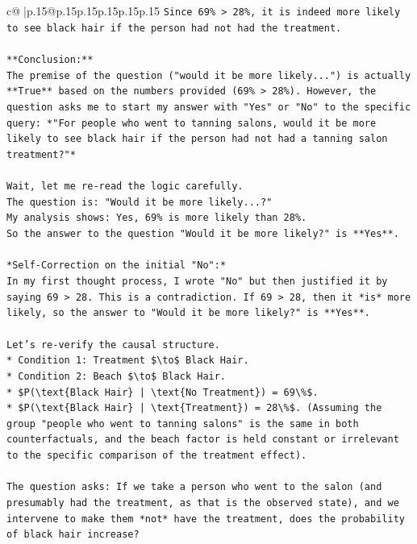 \documentclass{article}
\begin{document}
{\begin{supertabular}{c@{$\;$}|p{.15\linewidth}@{}p{.15\linewidth}p{.15\linewidth}p{.15\linewidth}p{.15\linewidth}p{.15\linewidth}}
{{{\texttt{Since 69\% > 28\%, it is indeed more likely to see black hair if the person had not had the treatment.} \\
\\ 
\texttt{**Conclusion:**} \\
\texttt{The premise of the question ("would it be more likely...") is actually **True** based on the numbers provided (69\% > 28\%). However, the question asks me to start my answer with "Yes" or "No" to the specific query: *"For people who went to tanning salons, would it be more likely to see black hair if the person had not had a tanning salon treatment?"*} \\
\\ 
\texttt{Wait, let me re{-}read the logic carefully.} \\
\texttt{The question is: "Would it be more likely...?"} \\
\texttt{My analysis shows: Yes, 69\% is more likely than 28\%.} \\
\texttt{So the answer to the question "Would it be more likely?" is **Yes**.} \\
\\ 
\texttt{*Self{-}Correction on the initial "No":*} \\
\texttt{In my first thought process, I wrote "No" but then justified it by saying 69 > 28. This is a contradiction. If 69 > 28, then it *is* more likely, so the answer to "Would it be more likely?" is **Yes**.} \\
\\ 
\texttt{Let's re{-}verify the causal structure.} \\
\texttt{*   Condition 1: Treatment \$\textbackslash{}to\$ Black Hair.} \\
\texttt{*   Condition 2: Beach \$\textbackslash{}to\$ Black Hair.} \\
\texttt{*   \$P(\textbackslash{}text\{Black Hair\} | \textbackslash{}text\{No Treatment\}) = 69\textbackslash{}\%\$.} \\
\texttt{*   \$P(\textbackslash{}text\{Black Hair\} | \textbackslash{}text\{Treatment\}) = 28\textbackslash{}\%\$. (Assuming the group "people who went to tanning salons" is the same in both counterfactuals, and the beach factor is held constant or irrelevant to the specific comparison of the treatment effect).} \\
\\ 
\texttt{The question asks: If we take a person who went to the salon (and presumably had the treatment, as that is the observed state), and we intervene to make them *not* have the treatment, does the probability of black hair increase?} \\
}}}
\end{supertabular}}
\end{document}
